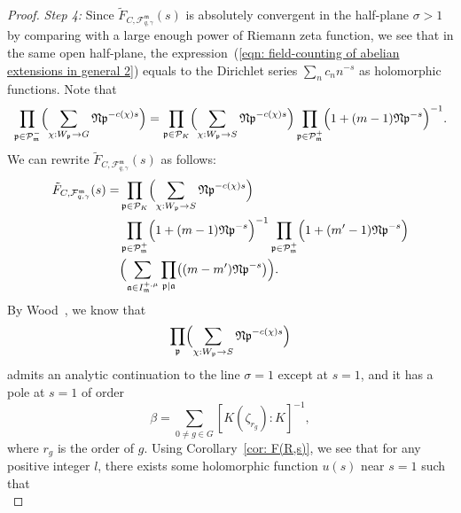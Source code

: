 \documentclass{amsart}
\numberwithin{equation}{section}
\theoremstyle{plain}
\theoremstyle{definition}
\theoremstyle{remark}
\begin{document}
\begin{proof}
	\emph{Step 4:}
	Since $\tilde{F}_{C,\mathcal{F}_{q,\gamma}^{\mathfrak{m}}}(s)$ is absolutely convergent in the half-plane $\sigma>1$ by comparing with a large enough power of Riemann zeta function,
	we see that in the same open half-plane, the expression~(\ref{eqn: field-counting of abelian extensions in general 2}) equals to the Dirichlet series $\sum_{n}c_nn^{-s}$ as holomorphic functions.
	Note that
	\begin{equation*}
		\prod_{\mathfrak{p}\in\mathcal{P}_{\mathfrak{m}}^-}\Bigl(
		\sum_{\chi:W_{\mathfrak{p}}\to G}\mathfrak{Np}^{-c(\chi)s}
		\Bigr)
		=\prod_{\mathfrak{p}\in\mathcal{P}_K}
		\Bigl(
		\sum_{\chi:W_{\mathfrak{p}}\to S}\mathfrak{Np}^{-c(\chi)s}
		\Bigr)
		\prod_{\mathfrak{p}\in\mathcal{P}_{\mathfrak{m}}^+}
		\Bigl(
		1+(m-1)\mathfrak{Np}^{-s}
		\Bigr)^{-1}.
	\end{equation*} 
	We can rewrite $\tilde{F}_{C,\mathcal{F}_{q,\gamma}^{\mathfrak{m}}}(s)$ as follows:
	\begin{equation*}
		\begin{aligned}
			\tilde{F}_{C,\mathcal{F}_{q,\gamma}^{\mathfrak{m}}}(s)
			=&\prod_{\mathfrak{p}\in\mathcal{P}_K}
			\Bigl(
			\sum_{\chi:W_{\mathfrak{p}}\to S}\mathfrak{Np}^{-c(\chi)s}
			\Bigr)
			\\
			&\prod_{\mathfrak{p}\in\mathcal{P}_{\mathfrak{m}}^+}
			\Bigl(
			1+(m-1)\mathfrak{Np}^{-s}
			\Bigr)^{-1}
			\prod_{\mathfrak{p}\in\mathcal{P}_{\mathfrak{m}}^+}
			\Bigl(
			1+(m'-1)\mathfrak{Np}^{-s}
			\Bigr)
			\\
			&\Bigl(\sum_{\mathfrak{a}\in I^{+,\mu}_{\mathfrak{m}}}
			\prod_{\mathfrak{p}\mid\mathfrak{a}}\bigl(
			(m-m')\mathfrak{Np}^{-s}			
			\bigr)\Bigr).
		\end{aligned}		
	\end{equation*}
	By Wood~\cite[Lemma 2.10]{wood2010probabilities}, we know that
	\begin{equation*}
		\prod_{\mathfrak{p}}
		\Bigl(
		\sum_{\chi:W_{\mathfrak{p}}\to S}\mathfrak{Np}^{-c(\chi)s}
		\Bigr)
	\end{equation*}
	admits an analytic continuation to the line $\sigma=1$ except at $s=1$, and it has a pole at $s=1$ of order
	\begin{equation*}
		\beta=\sum_{0\neq g\in G}[K(\zeta_{r_g}):K]^{-1},
	\end{equation*}
	where $r_g$ is the order of $g$.
	Using Corollary~\ref{cor: F(R,s)}, we see that for any positive integer $l$, there exists some holomorphic function $u(s)$ near $s=1$ such that
	\begin{equation}\label{eqn: field-counting of abelian extensions in general 3}

\end{equation}
\end{proof}
\end{document}

